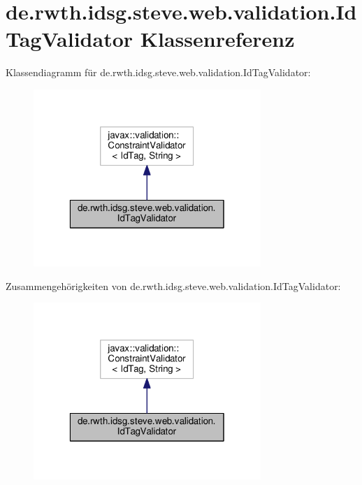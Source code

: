 \hypertarget{classde_1_1rwth_1_1idsg_1_1steve_1_1web_1_1validation_1_1_id_tag_validator}{\section{de.\-rwth.\-idsg.\-steve.\-web.\-validation.\-Id\-Tag\-Validator Klassenreferenz}
\label{classde_1_1rwth_1_1idsg_1_1steve_1_1web_1_1validation_1_1_id_tag_validator}
}


Klassendiagramm für de.\-rwth.\-idsg.\-steve.\-web.\-validation.\-Id\-Tag\-Validator\-:
\nopagebreak
\begin{figure}[H]
\begin{center}
\leavevmode
\includegraphics[width=244pt]{classde_1_1rwth_1_1idsg_1_1steve_1_1web_1_1validation_1_1_id_tag_validator__inherit__graph}
\end{center}
\end{figure}


Zusammengehörigkeiten von de.\-rwth.\-idsg.\-steve.\-web.\-validation.\-Id\-Tag\-Validator\-:
\nopagebreak
\begin{figure}[H]
\begin{center}
\leavevmode
\includegraphics[width=244pt]{classde_1_1rwth_1_1idsg_1_1steve_1_1web_1_1validation_1_1_id_tag_validator__coll__graph}
\end{center}
\end{figure}

